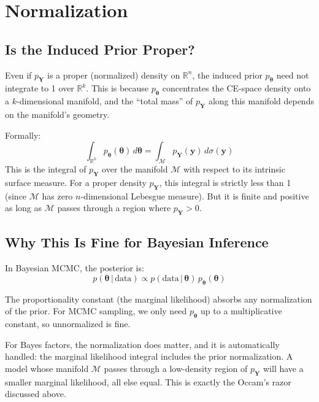 \documentclass[11pt,a4paper]{article}
\theoremstyle{definition}
\newcommand{\given}{\,|\,}
\newcommand{\btheta}{\boldsymbol{\theta}}
\begin{document}
\section{Normalization}
\label{sec:normalization}

\subsection{Is the Induced Prior Proper?}

Even if $p_{\mathbf{Y}}$ is a proper (normalized) density on $\mathbb{R}^n$,
the induced prior $p_{\btheta}$ need not integrate to 1 over $\mathbb{R}^k$.
This is because $p_{\btheta}$ concentrates the CE-space density onto a
$k$-dimensional manifold, and the ``total mass'' of $p_{\mathbf{Y}}$ along
this manifold depends on the manifold's geometry.

Formally:
\begin{equation}
    \int_{\mathbb{R}^k} p_{\btheta}(\btheta) \, d\btheta
    = \int_{\mathcal{M}} p_{\mathbf{Y}}(\mathbf{y}) \, d\sigma(\mathbf{y})
\end{equation}
This is the integral of $p_{\mathbf{Y}}$ over the manifold $\mathcal{M}$
with respect to its intrinsic surface measure. For a proper density
$p_{\mathbf{Y}}$, this integral is strictly less than 1 (since $\mathcal{M}$
has zero $n$-dimensional Lebesgue measure). But it is finite and positive as
long as $\mathcal{M}$ passes through a region where $p_{\mathbf{Y}} > 0$.

\subsection{Why This Is Fine for Bayesian Inference}

In Bayesian MCMC, the posterior is:
\begin{equation}
    p(\btheta \given \text{data}) \propto p(\text{data} \given \btheta) \,
    p_{\btheta}(\btheta)
\end{equation}

The proportionality constant (the marginal likelihood) absorbs any
normalization of the prior. For MCMC sampling, we only need $p_{\btheta}$ up
to a multiplicative constant, so unnormalized is fine.

For Bayes factors, the normalization does matter, and it is automatically
handled: the marginal likelihood integral includes the prior normalization.
A model whose manifold $\mathcal{M}$ passes through a low-density region of
$p_{\mathbf{Y}}$ will have a smaller marginal likelihood, all else equal.
This is exactly the Occam's razor discussed above.
\end{document}
